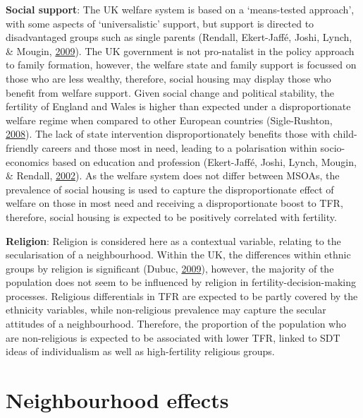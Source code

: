 \documentclass[12pt,twoside]{reedthesis}
\begin{document}
\textbf{Social support}: The UK welfare system is based on a `means-tested approach', with some aspects of `universalistic' support, but support is directed to disadvantaged groups such as single parents (Rendall, Ekert-Jaffé, Joshi, Lynch, \& Mougin, \protect\hyperlink{ref-rendall2009}{2009}). The UK government is not pro-natalist in the policy approach to family formation, however, the welfare state and family support is focussed on those who are less wealthy, therefore, social housing may display those who benefit from welfare support. Given social change and political stability, the fertility of England and Wales is higher than expected under a disproportionate welfare regime when compared to other European countries (Sigle-Rushton, \protect\hyperlink{ref-sigle-rushton2008}{2008}). The lack of state intervention disproportionately benefits those with child-friendly careers and those most in need, leading to a polarisation within socio-economics based on education and profession (Ekert-Jaffé, Joshi, Lynch, Mougin, \& Rendall, \protect\hyperlink{ref-ekert-jaffe2002}{2002}). As the welfare system does not differ between MSOAs, the prevalence of social housing is used to capture the disproportionate effect of welfare on those in most need and receiving a disproportionate boost to TFR, therefore, social housing is expected to be positively correlated with fertility.

\textbf{Religion}: Religion is considered here as a contextual variable, relating to the secularisation of a neighbourhood. Within the UK, the differences within ethnic groups by religion is significant (Dubuc, \protect\hyperlink{ref-dubuc2009}{2009}), however, the majority of the population does not seem to be influenced by religion in fertility-decision-making processes. Religious differentials in TFR are expected to be partly covered by the ethnicity variables, while non-religious prevalence may capture the secular attitudes of a neighbourhood. Therefore, the proportion of the population who are non-religious is expected to be associated with lower TFR, linked to SDT ideas of individualism as well as high-fertility religious groups.

\hypertarget{neighbourhood-effects}{%
\section{Neighbourhood effects}\label{neighbourhood-effects}}
\end{document}
